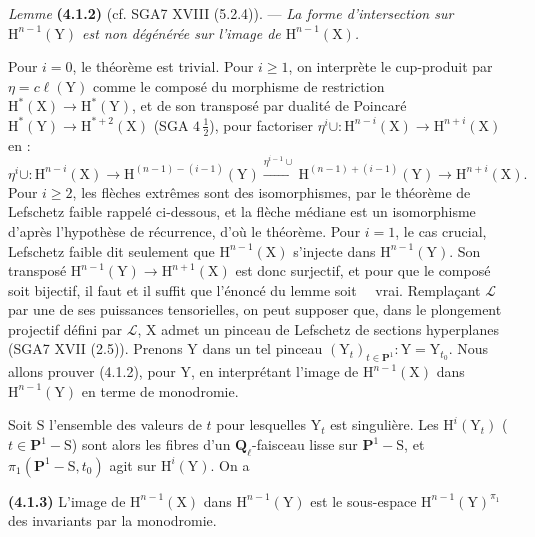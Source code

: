 \documentclass[11pt,leqno]{article}
\newcommand{\Page}[1]{\ifvmode\noindent\else\unskip\ \fi{\footnotesize\textcolor{gray}{[p.\,#1]}}\ \ignorespaces}
\begin{document}
\textit{Lemme} \textbf{(4.1.2)} (cf. SGA7 XVIII (5.2.4)). — \textit{La forme d’intersection sur \(\mathrm{H}^{n-1}(\mathrm{Y})\) est non dégénérée sur l’image de \(\mathrm{H}^{n-1}(\mathrm{X})\).}

Pour \(i=0\), le théorème est trivial. Pour \(i\geq1\), on interprète le cup-produit par \(\eta=c\ell(\mathrm{Y})\) comme le composé du morphisme de restriction \(\mathrm{H}^*(\mathrm{X})\to\mathrm{H}^*(\mathrm{Y})\), et de son transposé par dualité de Poincaré \(\mathrm{H}^*(\mathrm{Y})\to\mathrm{H}^{*+2}(\mathrm{X})\) (SGA \(4\,\frac12\)), pour factoriser \(\eta^i\cup:\mathrm{H}^{n-i}(\mathrm{X})\to\mathrm{H}^{n+i}(\mathrm{X})\) en :
\[
\eta^i\cup:\mathrm{H}^{n-i}(\mathrm{X})
\to\mathrm{H}^{(n-1)-(i-1)}(\mathrm{Y})
\xrightarrow{\eta^{i-1}\cup}
\mathrm{H}^{(n-1)+(i-1)}(\mathrm{Y})
\to\mathrm{H}^{n+i}(\mathrm{X}).
\]
Pour \(i\geq2\), les flèches extrêmes sont des isomorphismes, par le théorème de Lefschetz faible rappelé ci-dessous, et la flèche médiane est un isomorphisme d’après l’hypothèse de récurrence, d’où le théorème. Pour \(i=1\), le cas crucial, Lefschetz faible dit seulement que \(\mathrm{H}^{n-1}(\mathrm{X})\) s’injecte dans \(\mathrm{H}^{n-1}(\mathrm{Y})\). Son transposé \(\mathrm{H}^{n-1}(\mathrm{Y})\to\mathrm{H}^{n+1}(\mathrm{X})\) est donc surjectif, et pour que le composé soit bijectif, il faut et il suffit que l’énoncé du lemme soit
\Page{218}vrai. Remplaçant \(\mathscr{L}\) par une de ses puissances tensorielles, on peut supposer que, dans le plongement projectif défini par \(\mathscr{L}\), \(\mathrm{X}\) admet un pinceau de Lefschetz de sections hyperplanes (SGA7 XVII (2.5)). Prenons \(\mathrm{Y}\) dans un tel pinceau \((\mathrm{Y}_t)_{t\in\mathbf{P}^1}:\mathrm{Y}=\mathrm{Y}_{t_0}\). Nous allons prouver (4.1.2), pour \(\mathrm{Y}\), en interprétant l’image de \(\mathrm{H}^{n-1}(\mathrm{X})\) dans \(\mathrm{H}^{n-1}(\mathrm{Y})\) en terme de monodromie.

Soit \(\mathrm{S}\) l’ensemble des valeurs de \(t\) pour lesquelles \(\mathrm{Y}_t\) est singulière. Les \(\mathrm{H}^i(\mathrm{Y}_t)\) (\(t\in\mathbf{P}^1-\mathrm{S}\)) sont alors les fibres d’un \(\mathbf{Q}_\ell\)-faisceau lisse sur \(\mathbf{P}^1-\mathrm{S}\), et \(\pi_1(\mathbf{P}^1-\mathrm{S},t_0)\) agit sur \(\mathrm{H}^i(\mathrm{Y})\). On a

\textbf{(4.1.3)} L’image de \(\mathrm{H}^{n-1}(\mathrm{X})\) dans \(\mathrm{H}^{n-1}(\mathrm{Y})\) est le sous-espace \(\mathrm{H}^{n-1}(\mathrm{Y})^{\pi_1}\) des invariants par la monodromie.
\end{document}
